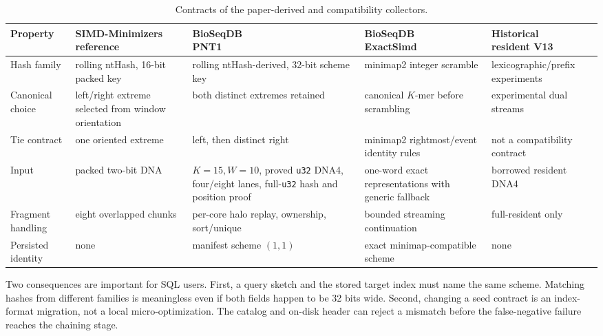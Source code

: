 \begin{table}[htbp]
\centering
\caption{Contracts of the paper-derived and compatibility collectors.}
\label{tab:pnt1-contract}
\footnotesize
\setlength{\tabcolsep}{3pt}
\renewcommand{\arraystretch}{1.12}
\begin{tabularx}{\textwidth}{
  >{\raggedright\arraybackslash\hspace{0pt}}p{}
  >{\raggedright\arraybackslash\hspace{0pt}}X
  >{\raggedright\arraybackslash\hspace{0pt}}X
  >{\raggedright\arraybackslash\hspace{0pt}}X
  >{\raggedright\arraybackslash\hspace{0pt}}X}
\toprule
Property &
\shortstack[l]{SIMD-Minimizers\\reference} &
\shortstack[l]{BioSeqDB\\PNT1} &
\shortstack[l]{BioSeqDB\\ExactSimd} &
\shortstack[l]{Historical\\resident V13} \\
\midrule
Hash family & rolling ntHash, 16-bit packed key & rolling ntHash-derived,
32-bit scheme key & minimap2 integer scramble & lexicographic/prefix
experiments \\
Canonical choice & left/right extreme selected from window orientation &
both distinct extremes retained & canonical $K$-mer before scrambling &
experimental dual streams \\
Tie contract & one oriented extreme & left, then distinct right & minimap2
rightmost/event identity rules & not a compatibility contract \\
Input & packed two-bit DNA & $K=15,W=10$, proved \texttt{u32} DNA4,
four/eight lanes,
full-\texttt{u32} hash and position proof & one-word exact
representations with generic fallback & borrowed resident DNA4 \\
Fragment handling & eight overlapped chunks & per-core halo replay, ownership,
sort/unique &
bounded streaming continuation & full-resident only \\
Persisted identity & none & manifest scheme $(1,1)$ & exact minimap-compatible scheme &
none \\
\bottomrule
\end{tabularx}
\end{table}

Two consequences are important for SQL users.  First, a query sketch and the
stored target index must name the same scheme. Matching hashes from different
families is meaningless even if both fields happen to be 32 bits wide.
Second, changing a seed contract is an index-format migration, not a local
micro-optimization.  The catalog and on-disk header can reject a mismatch
before the false-negative failure reaches the chaining stage.

